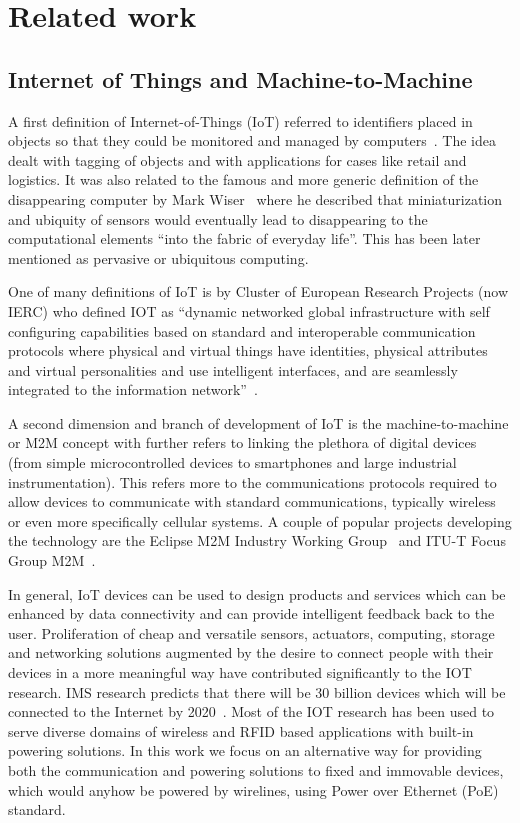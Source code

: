 \documentclass[final]{siamltex}
\begin{document}
\section{Related work}
\label{sec:related}

\subsection{Internet of Things and Machine-to-Machine}

A first definition of Internet-of-Things (IoT) referred to identifiers
placed in objects so that they could be monitored and managed by
computers~\cite{ashton2009internet}. The idea dealt with tagging of
objects and with applications for cases like retail and logistics. It
was also related to the famous and more generic definition of the
disappearing computer by Mark Wiser~\cite{weiser1991computer} where he
described that miniaturization and ubiquity of sensors would
eventually lead to disappearing to the computational elements ``into
the fabric of everyday life''.  This has been later mentioned as
pervasive or ubiquitous computing.

One of many definitions of IoT is by Cluster of European Research
Projects (now IERC) who defined IOT as ``dynamic networked global
infrastructure with self configuring capabilities based on standard
and interoperable communication protocols where physical and virtual
things have identities, physical attributes and virtual personalities
and use intelligent interfaces, and are seamlessly integrated to the
information network''~\cite{vermesan2011internet}.

A second dimension and branch of development of IoT is the
machine-to-machine or M2M concept with further refers to linking the
plethora of digital devices (from simple microcontrolled devices to
smartphones and large industrial instrumentation). This refers more to
the communications protocols required to allow devices to communicate
with standard communications, typically wireless or even more
specifically cellular systems.  A couple of popular projects
developing the technology are the Eclipse M2M Industry Working
Group~\cite{EclipseM2M} and ITU-T Focus Group M2M~\cite{ITU-T_FG_M2M}.

In general, IoT devices can be used to design products and services
which can be enhanced by
data connectivity and can provide intelligent feedback back to the user.
Proliferation of cheap and versatile sensors, actuators, computing, storage and
networking solutions augmented by the desire to connect people with their
devices in a more meaningful way have contributed significantly to the IOT
research. IMS research predicts that there will be 30 billion devices which will
be connected to the Internet by 2020~\cite{ABIresearch}. Most of the IOT
research has been used to serve diverse domains of wireless and RFID based
applications with built-in powering solutions. In this work we focus on an
alternative way for providing both the communication and powering solutions to
fixed and immovable devices, which would anyhow be powered by wirelines, using
Power over Ethernet (PoE) standard.
\end{document}
